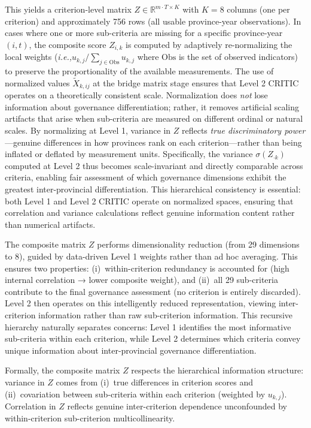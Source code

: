 \documentclass[12pt,a4paper]{article}
\newcommand{\ie}{\textit{i.e.,}\xspace}
\begin{document}
This yields a criterion-level matrix $Z \in \mathbb{R}^{m \cdot T \times K}$ with $K = 8$ columns (one per criterion) and approximately 756 rows (all usable province-year observations). In cases where one or more sub-criteria are missing for a specific province-year $(i, t)$, the composite score $Z_{i,k}$ is computed by adaptively re-normalizing the local weights (\ie $u_{k,j} / \sum_{j \in \text{Obs}} u_{k,j}$ where $\text{Obs}$ is the set of observed indicators) to preserve the proportionality of the available measurements. The use of normalized values $\tilde{X}_{k,ij}$ at the bridge matrix stage ensures that Level 2 CRITIC operates on a theoretically consistent scale. Normalization does \emph{not} lose information about governance differentiation; rather, it removes artificial scaling artifacts that arise when sub-criteria are measured on different ordinal or natural scales. By normalizing at Level 1, variance in $Z$ reflects \emph{true discriminatory power}---genuine differences in how provinces rank on each criterion---rather than being inflated or deflated by measurement units. Specifically, the variance $\sigma(Z_{\cdot k})$ computed at Level 2 thus becomes scale-invariant and directly comparable across criteria, enabling fair assessment of which governance dimensions exhibit the greatest inter-provincial differentiation. This hierarchical consistency is essential: both Level 1 and Level 2 CRITIC operate on normalized spaces, ensuring that correlation and variance calculations reflect genuine information content rather than numerical artifacts.

The composite matrix $Z$ performs dimensionality reduction (from 29 dimensions to 8), guided by data-driven Level 1 weights rather than ad hoc averaging. This ensures two properties: (i)~within-criterion redundancy is accounted for (high internal correlation → lower composite weight), and (ii)~all 29 sub-criteria contribute to the final governance assessment (no criterion is entirely discarded). Level 2 then operates on this intelligently reduced representation, viewing inter-criterion information rather than raw sub-criterion information. This recursive hierarchy naturally separates concerns: Level 1 identifies the most informative sub-criteria within each criterion, while Level 2 determines which criteria convey unique information about inter-provincial governance differentiation.

Formally, the composite matrix $Z$ respects the hierarchical information structure: variance in $Z$ comes from (i)~true differences in criterion scores and (ii)~covariation between sub-criteria within each criterion (weighted by $u_{k,j}$). Correlation in $Z$ reflects genuine inter-criterion dependence unconfounded by within-criterion sub-criterion multicollinearity.
\end{document}
